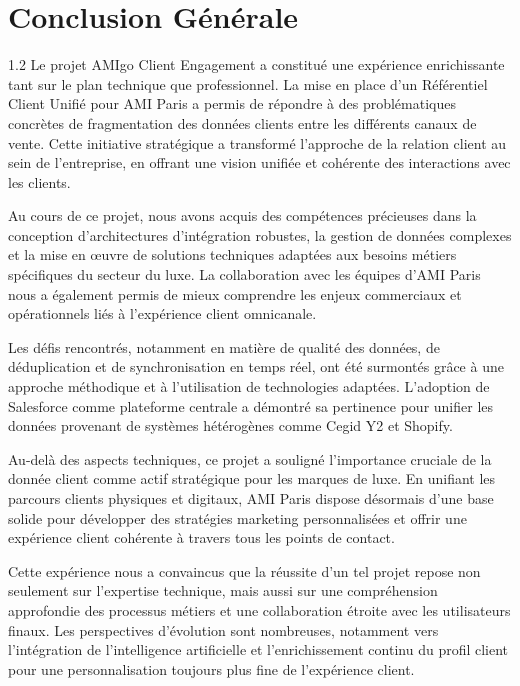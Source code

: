 \documentclass[12pt,a4paper,openany,oneside]{report}
\begin{document}


\cleardoublepage   


\cleardoublepage


\cleardoublepage


\cleardoublepage


\cleardoublepage
\section*{Conclusion Générale}
\thispagestyle{plain}


\begin{spacing}{1.2}
Le projet AMIgo Client Engagement a constitué une expérience enrichissante tant sur le plan technique que professionnel. La mise en place d'un Référentiel Client Unifié pour AMI Paris a permis de répondre à des problématiques concrètes de fragmentation des données clients entre les différents canaux de vente. Cette initiative stratégique a transformé l'approche de la relation client au sein de l'entreprise, en offrant une vision unifiée et cohérente des interactions avec les clients.

Au cours de ce projet, nous avons acquis des compétences précieuses dans la conception d'architectures d'intégration robustes, la gestion de données complexes et la mise en œuvre de solutions techniques adaptées aux besoins métiers spécifiques du secteur du luxe. La collaboration avec les équipes d'AMI Paris nous a également permis de mieux comprendre les enjeux commerciaux et opérationnels liés à l'expérience client omnicanale.

Les défis rencontrés, notamment en matière de qualité des données, de déduplication et de synchronisation en temps réel, ont été surmontés grâce à une approche méthodique et à l'utilisation de technologies adaptées. L'adoption de Salesforce comme plateforme centrale a démontré sa pertinence pour unifier les données provenant de systèmes hétérogènes comme Cegid Y2 et Shopify.

Au-delà des aspects techniques, ce projet a souligné l'importance cruciale de la donnée client comme actif stratégique pour les marques de luxe. En unifiant les parcours clients physiques et digitaux, AMI Paris dispose désormais d'une base solide pour développer des stratégies marketing personnalisées et offrir une expérience client cohérente à travers tous les points de contact.

Cette expérience nous a convaincus que la réussite d'un tel projet repose non seulement sur l'expertise technique, mais aussi sur une compréhension approfondie des processus métiers et une collaboration étroite avec les utilisateurs finaux. Les perspectives d'évolution sont nombreuses, notamment vers l'intégration de l'intelligence artificielle et l'enrichissement continu du profil client pour une personnalisation toujours plus fine de l'expérience client.
\end{spacing}
\end{document}
